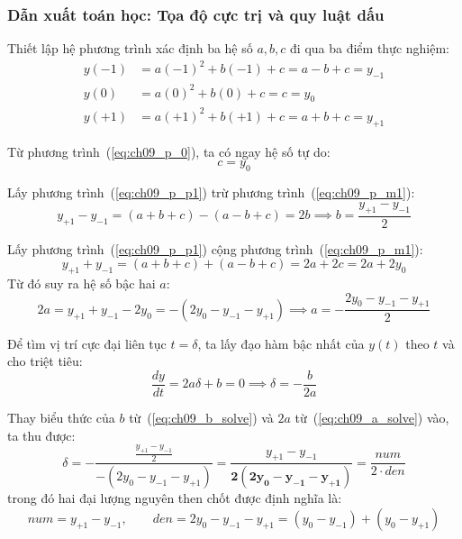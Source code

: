 \subsubsection*{Dẫn xuất toán học: Tọa độ cực trị và quy luật dấu}
Thiết lập hệ phương trình xác định ba hệ số $a, b, c$ đi qua ba điểm thực nghiệm:
\begin{align}
y(-1) &= a(-1)^2 + b(-1) + c = a - b + c = y_{-1} \label{eq:ch09_p_m1} \\
y(0)  &= a(0)^2 + b(0) + c = c = y_0 \label{eq:ch09_p_0} \\
y(+1) &= a(+1)^2 + b(+1) + c = a + b + c = y_{+1} \label{eq:ch09_p_p1}
\end{align}

Từ phương trình~(\ref{eq:ch09_p_0}), ta có ngay hệ số tự do:
\begin{equation}
c = y_0
\end{equation}

Lấy phương trình~(\ref{eq:ch09_p_p1}) trừ phương trình~(\ref{eq:ch09_p_m1}):
\begin{equation}
y_{+1} - y_{-1} = (a + b + c) - (a - b + c) = 2b \implies b = \frac{y_{+1} - y_{-1}}{2}
\label{eq:ch09_b_solve}
\end{equation}

Lấy phương trình~(\ref{eq:ch09_p_p1}) cộng phương trình~(\ref{eq:ch09_p_m1}):
\begin{equation}
y_{+1} + y_{-1} = (a + b + c) + (a - b + c) = 2a + 2c = 2a + 2y_0
\end{equation}
Từ đó suy ra hệ số bậc hai $a$:
\begin{equation}
2a = y_{+1} + y_{-1} - 2y_0 = -(2y_0 - y_{-1} - y_{+1}) \implies a = -\frac{2y_0 - y_{-1} - y_{+1}}{2}
\label{eq:ch09_a_solve}
\end{equation}

Để tìm vị trí cực đại liên tục $t = \delta$, ta lấy đạo hàm bậc nhất của $y(t)$ theo $t$ và cho triệt tiêu:
\begin{equation}
\frac{dy}{dt} = 2a\delta + b = 0 \implies \delta = -\frac{b}{2a}
\end{equation}

Thay biểu thức của $b$ từ~(\ref{eq:ch09_b_solve}) và $2a$ từ~(\ref{eq:ch09_a_solve}) vào, ta thu được:
\begin{equation}
\delta = -\frac{\frac{y_{+1} - y_{-1}}{2}}{-(2y_0 - y_{-1} - y_{+1})} = \frac{y_{+1} - y_{-1}}{\mathbf{2(2y_0 - y_{-1} - y_{+1})}} = \frac{num}{2 \cdot den}
\label{eq:ch09_delta_exact}
\end{equation}
trong đó hai đại lượng nguyên then chốt được định nghĩa là:
\begin{equation}
num = y_{+1} - y_{-1}, \qquad den = 2y_0 - y_{-1} - y_{+1} = (y_0 - y_{-1}) + (y_0 - y_{+1})
\end{equation}

